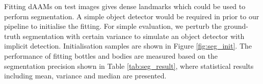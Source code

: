 Fitting dAAMs on test images gives dense landmarks which could be used to perform segmentation. A simple object detector would be required in prior to our pipeline to initialise the fitting. For simple evaluation, we perturb the ground-truth segmentation with certain variance to simulate an object detector with implicit detection. Initialisation samples are shown in Figure \ref{fig:seg_init}. The performance of fitting bottles and bodies are measured based on the segmentation precision shown in Table \ref{tab:seg_result}, where statistical results including mean, variance and median are presented.
    
{\small


}


